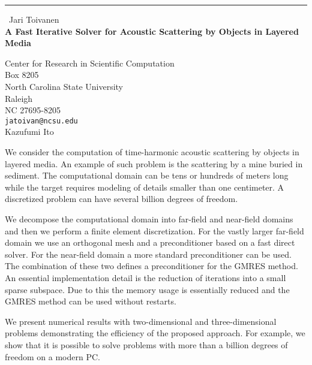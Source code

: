 \documentclass{report}
\begin{document}
\begin{center}
\rule{6in}{1pt} \
{\large Jari Toivanen \\
{\bf A Fast Iterative Solver for Acoustic Scattering by Objects in Layered Media}}

Center for Research in Scientific Computation \\ Box 8205 \\ North Carolina State University \\ Raleigh \\ NC 27695-8205
\\
{\tt jatoivan@ncsu.edu}\\
Kazufumi Ito\end{center}

We consider the computation of time-harmonic acoustic scattering
by objects in layered media. An example of such problem is the
scattering by a mine buried in sediment. The computational domain
can be tens or hundreds of meters long while the target requires
modeling of details smaller than one centimeter. A discretized
problem can have several billion degrees of freedom.

We decompose the computational domain into far-field and near-field
domains and then we perform a finite element discretization.
For the vastly larger far-field domain we use an orthogonal mesh
and a preconditioner based on a fast direct solver. For the
near-field domain a more standard preconditioner can be used.
The combination of these two defines a preconditioner for the
GMRES method. An essential implementation detail is the reduction
of iterations into a small sparse subspace. Due to this the memory
usage is essentially reduced and the GMRES method can be used
without restarts.

We present numerical results with two-dimensional and three-dimensional
problems demonstrating the efficiency of the proposed approach.
For example, we show that it is possible to solve problems with more
than a billion degrees of freedom on a modern PC.
\end{document}
